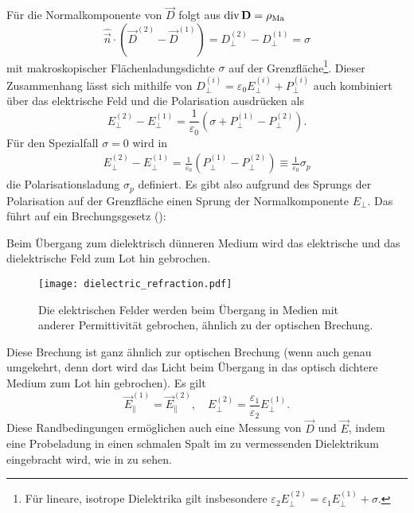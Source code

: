 Für die Normalkomponente von $\vec {D}$ folgt aus $\operatorname{div} \mathbf{D}=\rho _{\mathrm{Ma}}$
\begin{equation*}
	\hat{\vec {n}}\cdot \left(\vec {D}^{\left(2\right)}-\vec {D}^{\left(1\right)}\right)=D_{\perp }^{\left(2\right)}-D_{\perp }^{\left(1\right)}=\sigma
\end{equation*}
mit makroskopischer Flächenladungsdichte $\sigma $ auf der Grenzfläche\footnote{Für lineare, isotrope Dielektrika gilt insbesondere $\varepsilon _{2}E_{\perp }^{\left(2\right)}=\varepsilon _{1}E_{\perp }^{\left(1\right)}+\sigma .$}. Dieser Zusammenhang lässt sich mithilfe von $D_{\perp }^{\left(i\right)}=\varepsilon _{0}E_{\perp }^{\left(i\right)}+P_{\perp }^{\left(i\right)}$ auch kombiniert über das elektrische Feld und die Polarisation ausdrücken als
\begin{equation*}
	E_{\perp }^{\left(2\right)}-E_{\perp }^{\left(1\right)}=\frac{1}{\varepsilon _{0}}\left(\sigma +P_{\perp }^{\left(1\right)}-P_{\perp }^{\left(2\right)}\right).
\end{equation*}
Für den Spezialfall $\sigma =0$ wird in
\begin{align*}
	E_{\perp }^{\left(2\right)}-E_{\perp }^{\left(1\right)}=\frac{1}{\varepsilon _{0}}\left(P_{\perp }^{\left(1\right)}-P_{\perp }^{\left(2\right)}\right)\equiv \frac{1}{\varepsilon _{0}}\sigma _{p}
\end{align*}
die Polarisationsladung $\sigma _{p}$ definiert. Es gibt also aufgrund des Sprungs der Polarisation auf der Grenzfläche einen Sprung der Normalkomponente $E_{\perp }$. Das führt auf ein Brechungsgesetz ():

\begin{formal}
	Beim Übergang zum dielektrisch dünneren Medium wird das elektrische und das dielektrische Feld zum Lot hin gebrochen.
\end{formal}



\begin{figure}[htb]
	\centering
	\texttt{[image: dielectric\_refraction.pdf]}
	\caption{Die elektrischen Felder werden beim Übergang in Medien mit anderer Permittivität gebrochen, ähnlich zu der optischen Brechung. }
	\label{fig:dielectric_refraction}
\end{figure}

Diese Brechung ist ganz ähnlich zur optischen Brechung (wenn auch genau umgekehrt, denn dort wird das Licht beim Übergang in das optisch dichtere Medium zum Lot hin gebrochen). Es gilt
\begin{equation*}
	\vec {E}_{\parallel }^{\left(1\right)}=\vec {E}_{\parallel }^{\left(2\right)},\quad E_{\perp }^{\left(2\right)}=\frac{\varepsilon _{1}}{\varepsilon _{2}}E_{\perp }^{\left(1\right)}.
\end{equation*}
Diese Randbedingungen ermöglichen auch eine Messung von $\vec {D}$ und $\vec {E}$, indem eine Probeladung in einen schmalen Spalt im zu vermessenden Dielektrikum eingebracht wird, wie in  zu sehen.

